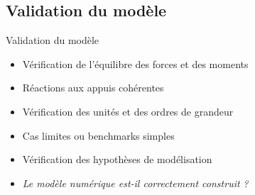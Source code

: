 \subsection{Validation du modèle}
\label{sec:Validation du modèle}

\begin{frame}[c]{Validation du modèle}

\begin{itemize}
    \item Vérification de l'équilibre des forces et des moments
    \item Réactions aux appuis cohérentes
    \item Vérification des unités et des ordres de grandeur
    \item Cas limites ou benchmarks simples
    \item Vérification des hypothèses de modélisation
    \item \textit{Le modèle numérique est-il correctement construit ?}
\end{itemize}

\end{frame}